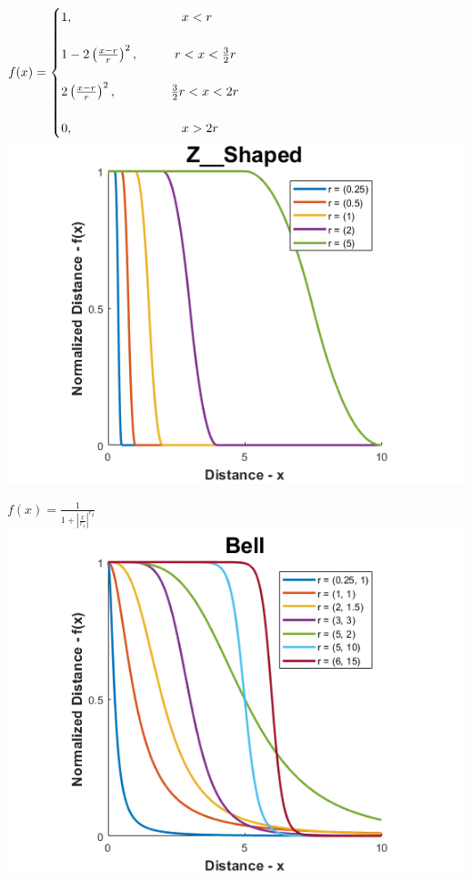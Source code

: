 \documentclass[12pt, a4paper, titlepage, openany]{book}
\begin{document}
\begin{description}[labelsep=1cm, labelwidth=2cm, nosep,,style=multiline,leftmargin=3cm]
\begin{description}[labelsep=14em, labelwidth=10em, nosep,style=multiline,leftmargin=6cm]
	\item[\texttt{"z\_shaped"}]	 $f(x) = \begin{cases} 1, \hspace{30mm}  x<r \\ \
	\\ 1 - 2 \left( \frac{x-r}{r}\right)^{2},  \hspace{10mm} r<x<\frac{3}{2}r \\ \
	\\ 2 \left( \frac{x-r}{r}\right)^{2},  \hspace{15mm} \frac{3}{2}r<x<2r \\ \
	\\ 0,  \hspace{30mm}  x>2r \end{cases}$ \\
		\includegraphics[scale=.5]{FuzzZSv1.png} \\
		
	\item[\texttt{"bell"}] $f\left( x \right) = \frac{1}{1+{\left |\frac{x}{r_1 }\right|}^{r_2 } }$ \\ 
		\includegraphics[scale=.5]{FuzzBv1.png}\\
				

\end{description}
\end{description}
\end{document}
